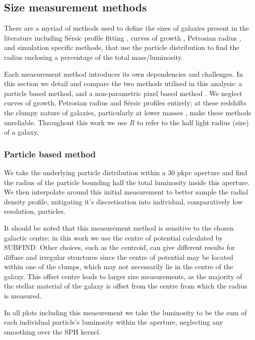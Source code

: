 \subsection{Size measurement methods}
\label{sec:measure}

There are a myriad of methods used to define the sizes of galaxies present in the literature including S\'ersic profile fitting \citep{Sersic1963, Sersic1968}, curves of growth \citep[e.g.][]{Ferguson_2004, Bouwens_2004, Oesch_2010}, Petrosian radius \citep{Petrosian1976},
and simulation specific methods, that use the particle distribution to find the radius enclosing a percentage of the total mass/luminosity. 

Each measurement method introduces its own dependencies and challenges. In this section we detail and compare the two methods utilised in this analysis: a particle based method, and a non-parametric pixel based method \citep[e.g.][]{Ribeiro2016, Ma_18_size, Marshall21}. We neglect curves of growth, Petrosian radius and S\'ersic profiles entirely; at these redshifts the clumpy nature of galaxies, particularly at lower masses \citep{Jiang_2013, Bowler2016}, make these methods unreliable. Throughout this work we use $R$ to refer to the half light radius (size) of a galaxy.

\subsubsection{Particle based method}

We take the underlying particle distribution within a 30 pkpc aperture and find the radius of the particle bounding half the total luminosity inside this aperture. We then interpolate around this initial measurement to better sample the radial density profile, mitigating it's discretisation into individual, comparatively low resolution, particles. 

It should be noted that this measurement method is sensitive to the chosen galactic centre; in this work we use the centre of potential calculated by SUBFIND. Other choices, such as the centroid, can give different results for diffuse and irregular structures since the centre of potential may be located within one of the clumps, which may not necessarily lie in the centre of the galaxy. This offset centre leads to larger size measurements, as the majority of the stellar material of the galaxy is offset from the centre from which the radius is measured.

In all plots including this measurement we take the luminosity to be the sum of each individual particle's luminosity within the aperture, neglecting any smoothing over the SPH kernel. 

